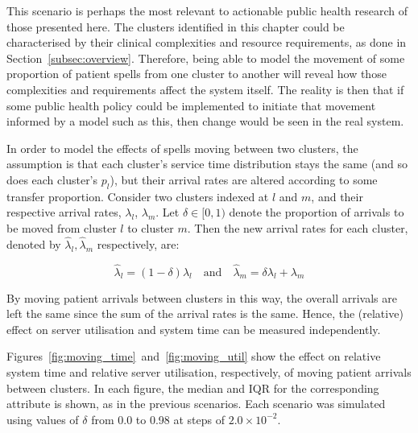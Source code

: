 This scenario is perhaps the most relevant to actionable public health research
of those presented here. The clusters identified in this chapter could be
characterised by their clinical complexities and resource requirements, as done
in Section~\ref{subsec:overview}. Therefore, being able to model the movement of
some proportion of patient spells from one cluster to another will reveal how
those complexities and requirements affect the system itself. The reality is
then that if some public health policy could be implemented to initiate that
movement informed by a model such as this, then change would be seen in the real
system.

In order to model the effects of spells moving between two clusters, the
assumption is that each cluster's service time distribution stays the same (and
so does each cluster's \(p_l\)), but their arrival rates are altered according
to some transfer proportion. Consider two clusters indexed at \(l\) and \(m\),
and their respective arrival rates, \(\lambda_l\), \(\lambda_m\). Let \(\delta
\in [0, 1)\) denote the proportion of arrivals to be moved from cluster \(l\) to
cluster \(m\). Then the new arrival rates for each cluster, denoted by
\(\hat\lambda_l, \hat\lambda_m\) respectively, are:

\begin{equation}\label{eq:moving}
    \hat\lambda_l = \left(1 - \delta\right) \lambda_l
    \quad \text{and} \quad
    \hat\lambda_m = \delta\lambda_l + \lambda_m
\end{equation}

By moving patient arrivals between clusters in this way, the overall arrivals
are left the same since the sum of the arrival rates is the same. Hence, the
(relative) effect on server utilisation and system time can be measured
independently.

Figures~\ref{fig:moving_time}~and~\ref{fig:moving_util} show the effect on
relative system time and relative server utilisation, respectively, of moving
patient arrivals between clusters. In each figure, the median and IQR for the
corresponding attribute is shown, as in the previous scenarios. Each scenario
was simulated using values of \(\delta\) from 0.0 to 0.98 at steps of \(2.0
\times 10^{-2}\).

